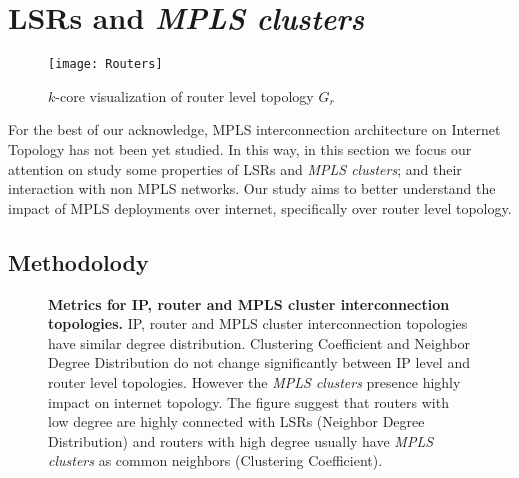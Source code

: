 \section{LSRs and \textit{MPLS clusters}}\label{cluster}
      
\begin{figure}[!t]
	\centering
		\texttt{[image: Routers]}
		\caption{$k$-core visualization of router level topology $G_{r}$ }
		\label{fig_k_core_routers}
\end{figure}

For the best of our acknowledge, MPLS interconnection architecture on Internet Topology has not been yet studied. 
In this way, in this section we focus our attention on study some properties of LSRs and \textit{MPLS clusters}; and their interaction with non MPLS networks. 
Our study aims to better understand the impact of MPLS deployments over internet, specifically over router level topology.

\subsection{Methodolody}\label{cluster.methodo}

\begin{figure*}[!htb]
  \begin{center}
    \hfil
    \hfil
  \end{center}
\caption{\textbf{Metrics for IP, router and MPLS cluster interconnection topologies.} IP, router and MPLS cluster interconnection topologies have similar degree distribution. Clustering Coefficient and Neighbor Degree Distribution do not change significantly between IP level and router level topologies. However the \textit{MPLS clusters} presence highly impact on internet topology. The figure suggest that routers with low degree are highly connected with LSRs (Neighbor Degree Distribution) and routers with high degree usually have \textit{MPLS clusters} as common neighbors (Clustering Coefficient).} \label{fig_metrics}
\end{figure*}

